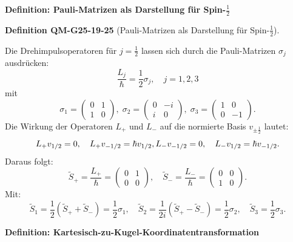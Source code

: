 \documentclass[10pt, letterpaper]{article}
\newcommand{\CustomHeading}[3]{%
  \par\medskip\noindent%
  \textbf{#1 #2} \textnormal{(#3)}.\enskip%
}
\newenvironment{DEF}[2]{\begin{unitbox}\CustomHeading{Definition}{#1}{#2}}{\end{unitbox}}
\begin{document}
\textbf{Definition: Pauli-Matrizen als Darstellung für Spin-\(\frac{1}{2}\)}


\begin{DEF}{QM-G25-19-25}{Pauli-Matrizen als Darstellung für Spin-\(\frac{1}{2}\)}
Die Drehimpulsoperatoren für \(j = \frac{1}{2}\) lassen sich durch die Pauli-Matrizen \(\sigma_j\) ausdrücken:
$$
\frac{L_j}{\hbar} = \frac{1}{2} \sigma_j, \quad j = 1, 2, 3
$$
mit
$$
\sigma_1 = \begin{pmatrix} 0 & 1 \\ 1 & 0 \end{pmatrix},\;
\sigma_2 = \begin{pmatrix} 0 & -i \\ i & 0 \end{pmatrix},\;
\sigma_3 = \begin{pmatrix} 1 & 0 \\ 0 & -1 \end{pmatrix}.
$$
Die Wirkung der Operatoren \(L_+\) und \(L_-\) auf die normierte Basis \(v_{\pm \frac{1}{2}}\) lautet:
$$
L_+ v_{1/2} = 0, \quad L_+ v_{-1/2} = \hbar v_{1/2}, \\
L_- v_{-1/2} = 0, \quad L_- v_{1/2} = \hbar v_{-1/2}.
$$
Daraus folgt:
$$
\tilde{S}_+ = \frac{L_+}{\hbar} = \begin{pmatrix} 0 & 1 \\ 0 & 0 \end{pmatrix}, \quad
\tilde{S}_- = \frac{L_-}{\hbar} = \begin{pmatrix} 0 & 0 \\ 1 & 0 \end{pmatrix}.
$$
Mit:
$$
\tilde{S}_1 = \frac{1}{2}(\tilde{S}_+ + \tilde{S}_-) = \frac{1}{2} \sigma_1, \quad
\tilde{S}_2 = \frac{1}{2i}(\tilde{S}_+ - \tilde{S}_-) = \frac{1}{2} \sigma_2, \quad
\tilde{S}_3 = \frac{1}{2} \sigma_3.
$$
\end{DEF}


\textbf{Definition: Kartesisch-zu-Kugel-Koordinatentransformation}  
\end{document}
